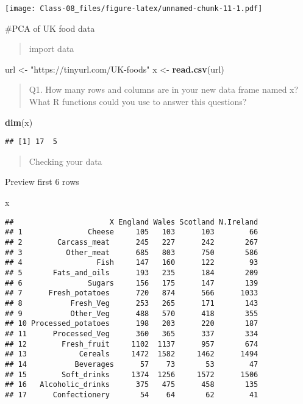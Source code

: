 \documentclass[]{article}
\newenvironment{Shaded}{\begin{snugshade}}{\end{snugshade}}
\newcommand{\KeywordTok}[1]{\textcolor[rgb]{0.13,0.29,0.53}{\textbf{#1}}}
\newcommand{\NormalTok}[1]{#1}
\newcommand{\StringTok}[1]{\textcolor[rgb]{0.31,0.60,0.02}{#1}}
\begin{document}
\texttt{[image: Class-08\_files/figure-latex/unnamed-chunk-11-1.pdf]}

\#PCA of UK food data

\begin{quote}
import data
\end{quote}

\begin{Shaded}
\begin{Highlighting}[]
\NormalTok{url <-}\StringTok{ "https://tinyurl.com/UK-foods"}
\NormalTok{x <-}\StringTok{ }\KeywordTok{read.csv}\NormalTok{(url)}
\end{Highlighting}
\end{Shaded}

\begin{quote}
Q1. How many rows and columns are in your new data frame named x? What R
functions could you use to answer this questions?
\end{quote}

\begin{Shaded}
\begin{Highlighting}[]
\KeywordTok{dim}\NormalTok{(x)}
\end{Highlighting}
\end{Shaded}

\begin{verbatim}
## [1] 17  5
\end{verbatim}

\begin{quote}
Checking your data
\end{quote}

Preview first 6 rows

\begin{Shaded}
\begin{Highlighting}[]
\NormalTok{x}
\end{Highlighting}
\end{Shaded}

\begin{verbatim}
##                      X England Wales Scotland N.Ireland
## 1               Cheese     105   103      103        66
## 2        Carcass_meat      245   227      242       267
## 3          Other_meat      685   803      750       586
## 4                 Fish     147   160      122        93
## 5       Fats_and_oils      193   235      184       209
## 6               Sugars     156   175      147       139
## 7      Fresh_potatoes      720   874      566      1033
## 8           Fresh_Veg      253   265      171       143
## 9           Other_Veg      488   570      418       355
## 10 Processed_potatoes      198   203      220       187
## 11      Processed_Veg      360   365      337       334
## 12        Fresh_fruit     1102  1137      957       674
## 13            Cereals     1472  1582     1462      1494
## 14           Beverages      57    73       53        47
## 15        Soft_drinks     1374  1256     1572      1506
## 16   Alcoholic_drinks      375   475      458       135
## 17      Confectionery       54    64       62        41
\end{verbatim}
\end{document}
